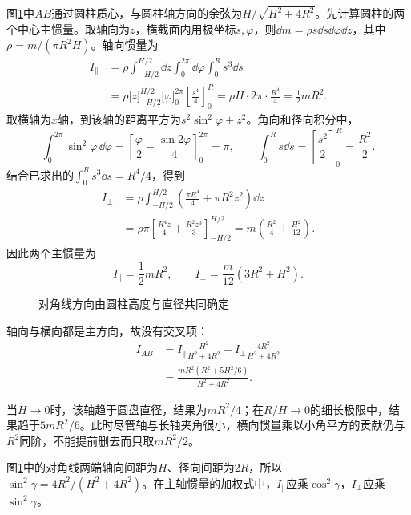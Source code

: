 \begin{solution}
图\ref{fig:hw6-3-s}中$AB$通过圆柱质心，与圆柱轴方向的余弦为$H/\sqrt{H^2+4R^2}$。先计算圆柱的两个中心主惯量。取轴向为$z$，横截面内用极坐标$s,\varphi$，则$\dd m=\rho s\dd s\dd\varphi\dd z$，其中$\rho=m/(\pi R^2H)$。轴向惯量为
\[
\begin{aligned}
I_\parallel&=\rho\int_{-H/2}^{H/2}\dd z\int_0^{2\pi}\dd\varphi\int_0^Rs^3\dd s\\
&=\rho\bigl[z\bigr]_{-H/2}^{H/2}\bigl[\varphi\bigr]_0^{2\pi}
\left[\frac{s^4}{4}\right]_0^R
=\rho H\cdot2\pi\cdot\frac{R^4}{4}=\frac12mR^2.
\end{aligned}
\]
取横轴为$x$轴，到该轴的距离平方为$s^2\sin^2\varphi+z^2$。角向和径向积分中，
\[
\int_0^{2\pi}\sin^2\varphi\,\dd\varphi
=\left[\frac\varphi2-\frac{\sin2\varphi}{4}\right]_0^{2\pi}=\pi,
\qquad \int_0^Rs\dd s=\left[\frac{s^2}{2}\right]_0^R=\frac{R^2}{2}.
\]
结合已求出的$\int_0^Rs^3\dd s=R^4/4$，得到
\[
\begin{aligned}
I_\perp&=\rho\int_{-H/2}^{H/2}\left(\frac{\pi R^4}{4}+\pi R^2z^2\right)\dd z\\
&=\rho\pi\left[\frac{R^4z}{4}+\frac{R^2z^3}{3}\right]_{-H/2}^{H/2}
=m\left(\frac{R^2}{4}+\frac{H^2}{12}\right).
\end{aligned}
\]
因此两个主惯量为
\[
 I_\parallel=\frac12mR^2,\qquad
 I_\perp=\frac{m}{12}(3R^2+H^2).
\]

\begin{figure}[H]\centering
{}
\caption{对角线方向由圆柱高度与直径共同确定}\label{fig:hw6-3-s}
\end{figure}

轴向与横向都是主方向，故没有交叉项：
\begin{align*}
 I_{AB}&=I_\parallel\frac{H^2}{H^2+4R^2}
 +I_\perp\frac{4R^2}{H^2+4R^2}\\
 &=\boxed{\frac{mR^2(R^2+5H^2/6)}{H^2+4R^2}}.
\end{align*}

当$H\to0$时，该轴趋于圆盘直径，结果为$mR^2/4$；在$R/H\to0$的细长极限中，结果趋于$5mR^2/6$。此时尽管轴与长轴夹角很小，横向惯量乘以小角平方的贡献仍与$R^2$同阶，不能提前删去而只取$mR^2/2$。


图\ref{fig:hw6-3-s}中的对角线两端轴向间距为$H$、径向间距为$2R$，所以$\sin^2\gamma=4R^2/(H^2+4R^2)$。在主轴惯量的加权式中，$I_\parallel$应乘$\cos^2\gamma$，$I_\perp$应乘$\sin^2\gamma$。

\end{solution}



